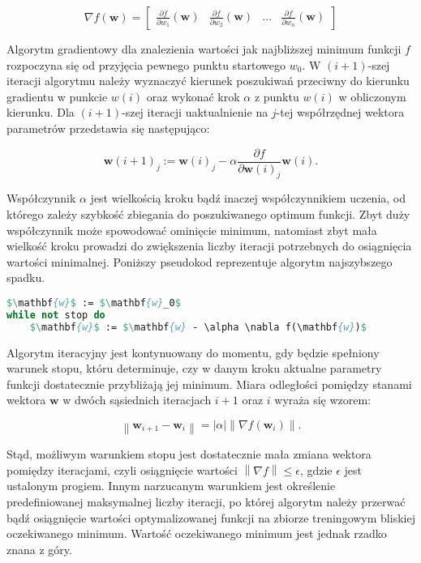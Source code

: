 \documentclass{pracamgr}
\newcommand{\norm}[1]{\left\lVert#1\right\rVert}
\newcommand{\abs}[1]{\lvert#1\rvert}
\begin{document}
\[
\nabla f(\mathbf{w}) = \begin{bmatrix} \frac{\partial f}{\partial w_1} (\mathbf{w}) & \frac{\partial f}{\partial w_2} (\mathbf{w}) & \ldots & \frac{\partial f}{\partial w_n} (\mathbf{w}) \end{bmatrix}
\]

Algorytm gradientowy dla znalezienia wartości jak najbliższej minimum funkcji $f$ rozpoczyna się od przyjęcia pewnego punktu startowego $w_0$. W $(i+1)$-szej iteracji algorytmu należy wyznaczyć kierunek poszukiwań przeciwny do kierunku gradientu w punkcie $w(i)$ oraz wykonać krok $\alpha$ z punktu $w(i)$ w obliczonym kierunku. Dla $(i+1)$-szej iteracji uaktualnienie na $j$-tej współrzędnej wektora parametrów przedstawia się następująco:

\[
\mathbf{w}(i+1)_{j} := \mathbf{w}(i)_j - \alpha \frac{\partial f}{\partial \mathbf{w}(i)_j}\mathbf{w}(i).
\]

Współczynnik $\alpha$ jest wielkością kroku bądź inaczej współczynnikiem uczenia, od którego zależy szybkość zbiegania do poszukiwanego optimum funkcji. Zbyt duży współczynnik może spowodować ominięcie minimum, natomiast zbyt mała wielkość kroku prowadzi do zwiększenia liczby iteracji potrzebnych do osiągnięcia wartości minimalnej. Poniższy pseudokod reprezentuje algorytm najszybszego spadku.

\begin{minipage}{\linewidth}
\begin{lstlisting}[language=Pascal, mathescape=true,frame=single,caption={Metoda najszybszego spadku},captionpos=b]
$\mathbf{w}$ := $\mathbf{w}_0$
while not stop do
    $\mathbf{w}$ := $\mathbf{w} - \alpha \nabla f(\mathbf{w})$

\end{lstlisting}
\end{minipage}

Algorytm iteracyjny jest kontynuowany do momentu, gdy będzie spełniony warunek stopu, któru determinuje, czy w danym kroku aktualne parametry funkcji dostatecznie przybliżają jej minimum. Miara odległości pomiędzy stanami wektora $\mathbf{w}$ w dwóch sąsiednich iteracjach $i+1$ oraz $i$ wyraża się wzorem:

\[
\norm{\mathbf{w}_{i+1} - \mathbf{w}_{i}} = \abs{\alpha} \norm{\nabla f(\mathbf{w}_{i})}.
\]

Stąd, możliwym warunkiem stopu jest dostatecznie mała zmiana wektora pomiędzy iteracjami, czyli osiągnięcie wartości $\norm{\nabla f} \leq \epsilon$, gdzie $\epsilon$ jest ustalonym progiem. Innym narzucanym warunkiem jest określenie predefiniowanej maksymalnej liczby iteracji, po której algorytm należy przerwać bądź osiągnięcie wartości optymalizowanej funkcji na zbiorze treningowym bliskiej oczekiwanego minimum. Wartość oczekiwanego minimum jest jednak rzadko znana z góry.
\end{document}
